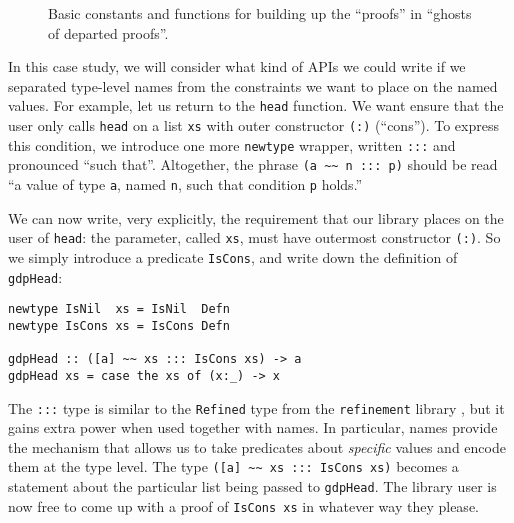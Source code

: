 \documentclass[format=sigplan, review=false, screen=true]{acmart}
\begin{document}
\begin{figure}
  \inputminted{haskell}{pred.hs}
  \caption{Basic constants and functions for building up the ``proofs''
    in ``ghosts of departed proofs''. 
    \label{predicate-logic}}
\end{figure}


In this case study, we will consider what kind of APIs we could write if we separated
type-level names from the constraints we want to place on the named values.
For example, let us return to the \texttt{head} function. We want ensure that the
user only calls \texttt{head} on a list \texttt{xs} with outer constructor \texttt{(:)} (``cons'').
To express this condition, we introduce one more \texttt{newtype} wrapper,
written \texttt{:::} and pronounced ``such that''. Altogether, the phrase 
\verb|(a ~~ n ::: p)| should be read ``a value of type \texttt{a}, named \texttt{n}, such
that condition \texttt{p} holds.''


We can now write, very explicitly, the requirement that our library places on the user
of \texttt{head}: the parameter, called \texttt{xs}, must have outermost constructor
\texttt{(:)}. So we simply introduce a predicate \texttt{IsCons}, and write down the definition
of \texttt{gdpHead}:
\begin{verbatim}
newtype IsNil  xs = IsNil  Defn
newtype IsCons xs = IsCons Defn

gdpHead :: ([a] ~~ xs ::: IsCons xs) -> a
gdpHead xs = case the xs of (x:_) -> x
\end{verbatim}
The \texttt{:::} type is similar to the \texttt{Refined} type from the \texttt{refinement} library \cite{refined},
but it gains extra power when used together with names.
In particular, names provide the mechanism that allows us to take predicates about \emph{specific} values and
encode them at the type level.
The type \verb|([a] ~~ xs ::: IsCons xs)| becomes a statement about the particular list being passed to \texttt{gdpHead}.
The library user is now free to come up with a proof of \texttt{IsCons xs} in whatever way they please.
\end{document}
